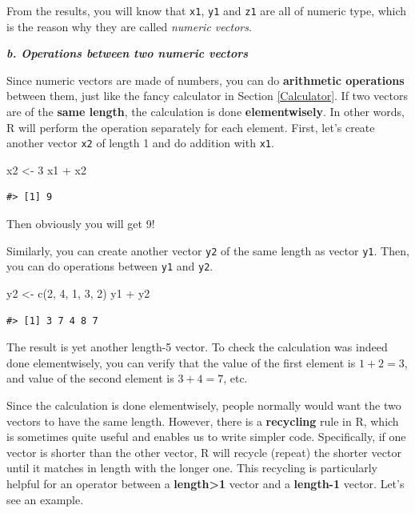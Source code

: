 \documentclass[
]{book}
\newenvironment{Shaded}{\begin{snugshade}}{\end{snugshade}}
\newcommand{\DecValTok}[1]{\textcolor[rgb]{0.00,0.00,0.81}{#1}}
\newcommand{\FunctionTok}[1]{\textcolor[rgb]{0.00,0.00,0.00}{#1}}
\newcommand{\NormalTok}[1]{#1}
\newcommand{\OtherTok}[1]{\textcolor[rgb]{0.56,0.35,0.01}{#1}}
\newcommand{\SpecialCharTok}[1]{\textcolor[rgb]{0.00,0.00,0.00}{#1}}
\begin{document}
From the results, you will know that \texttt{x1}, \texttt{y1} and \texttt{z1} are all of numeric type, which is the reason why they are called \emph{numeric vectors}.

\textbf{\emph{b. Operations between two numeric vectors}}

Since numeric vectors are made of numbers, you can do \textbf{arithmetic operations} between them, just like the fancy calculator in Section \ref{Calculator}. If two vectors are of the \textbf{same length}, the calculation is done \textbf{elementwisely}. In other words, R will perform the operation separately for each element. First, let's create another vector \texttt{x2} of length 1 and do addition with \texttt{x1}.

\begin{Shaded}
\begin{Highlighting}[]
\NormalTok{x2 }\OtherTok{\textless{}{-}} \DecValTok{3}
\NormalTok{x1 }\SpecialCharTok{+}\NormalTok{ x2}
\end{Highlighting}
\end{Shaded}

\begin{verbatim}
#> [1] 9
\end{verbatim}

Then obviously you will get 9!

Similarly, you can create another vector \texttt{y2} of the same length as vector \texttt{y1}. Then, you can do operations between \texttt{y1} and \texttt{y2}.

\begin{Shaded}
\begin{Highlighting}[]
\NormalTok{y2 }\OtherTok{\textless{}{-}} \FunctionTok{c}\NormalTok{(}\DecValTok{2}\NormalTok{, }\DecValTok{4}\NormalTok{, }\DecValTok{1}\NormalTok{, }\DecValTok{3}\NormalTok{, }\DecValTok{2}\NormalTok{)}
\NormalTok{y1 }\SpecialCharTok{+}\NormalTok{ y2}
\end{Highlighting}
\end{Shaded}

\begin{verbatim}
#> [1] 3 7 4 8 7
\end{verbatim}

The result is yet another length-5 vector. To check the calculation was indeed done elementwisely, you can verify that the value of the first element is \(1 + 2 = 3\), and value of the second element is \(3 + 4 = 7\), etc.

Since the calculation is done elementwisely, people normally would want the two vectors to have the same length. However, there is a \textbf{recycling} rule in R, which is sometimes quite useful and enables us to write simpler code. Specifically, if one vector is shorter than the other vector, R will recycle (repeat) the shorter vector until it matches in length with the longer one. This recycling is particularly helpful for an operator between a \textbf{length\textgreater1} vector and a \textbf{length-1} vector. Let's see an example.
\end{document}
